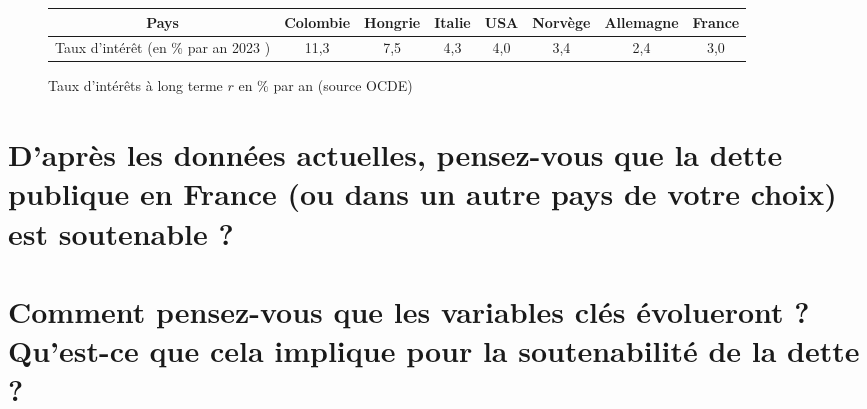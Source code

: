 \documentclass{article}
\begin{document}
\begin{figure}[h!]
    \centering
    \begin{tabular}{ | c | c | c |  c |  c |  c |  c |  c | }
      \hline
      Pays & Colombie & Hongrie & Italie & USA  & Norvège & Allemagne & France \\ \hline
      Taux d'intérêt (en \% par an 2023 ) & 11,3 & 7,5 & 4,3 & 4,0 & 3,4 & 2,4 & 3,0 \\ \hline
    \end{tabular}
    \caption{Taux d'intérêts à long terme $r$ en \% par an (source OCDE)}
\end{figure}
    



\section{D’après les données actuelles, pensez-vous que la dette publique en France (ou dans un autre pays
de votre choix) est soutenable ?
}

\section{Comment pensez-vous que les variables clés évolueront ? Qu’est-ce que cela implique pour la
soutenabilité de la dette ?}
\end{document}
